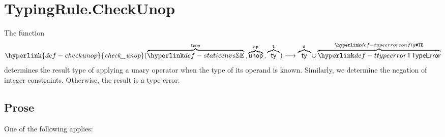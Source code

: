 \documentclass{book}
\newcommand\ProseOtherwiseTypeError[0]{Otherwise, the result is a type error.}
\newcommand\CheckUnop[0]{\hyperlink{def-checkunop}{\textfunc{check\_unop}}}
\begin{document}
\section{TypingRule.CheckUnop \label{sec:TypingRule.CheckUnop}}
\hypertarget{def-checkunop}{}
The function
\[
  \CheckUnop(\overname{\staticenvs}{\tenv} \aslsep \overname{\unop}{\op} \aslsep \overname{\ty}{\vt})
  \aslto \overname{\ty}{\vs} \cup \overname{\TTypeError}{\TypeErrorConfig}
\]
determines the result type of applying a unary operator when the type of its operand is known.
Similarly, we determine the negation of integer constraints.
\ProseOtherwiseTypeError

\subsection{Prose}
One of the following applies:
\end{document}

